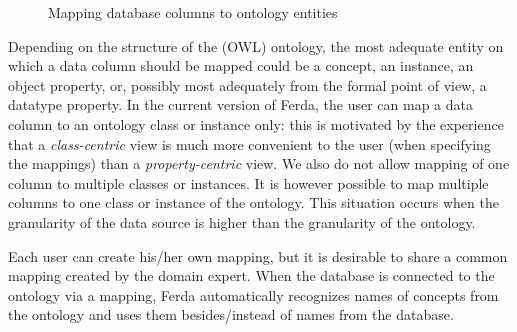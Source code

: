 \begin{figure}[ht]
\centering
\mbox{}
\caption{Mapping database columns to ontology entities}
\label{fig:Mapping}
\end{figure}

Depending on the structure of the (OWL) ontology, the most adequate entity on which a data column should be mapped could be a concept, an instance, an object property, or, possibly most adequately from the formal point of view, a datatype property.
In the current version of Ferda, the user can map a data column to an ontology class or instance only: this is motivated by the experience that a \emph{class-centric} view is much more convenient to the user (when specifying the mappings) than a \emph{property-centric} view. 
We also do not allow mapping of one column to multiple classes or instances. 
It is however possible to map multiple columns to one class or instance of the ontology. 
This situation occurs when the granularity of the data source is higher than the granularity of the ontology.

Each user can create his/her own mapping, but it is desirable to share a common mapping created by the domain expert. 
When the database is connected to the ontology via a mapping, Ferda automatically recognizes names of concepts from the ontology and uses them besides/instead of names from the database. 


